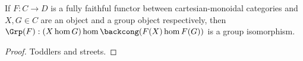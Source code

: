 \begin{lemma}
  \label{0-full-faithful-grp-hom}
  \leanok

  If $F : C \to D$ is a fully faithful functor between cartesian-monoidal categories
  and $X, G \in C$ are an object and a group object respectively,
  then $\Grp(F) : (X \hom G) \hom \backcong (F(X) \hom F(G))$ is a group isomorphism.
\end{lemma}
\begin{proof}
  \uses{}
  \leanok

  Toddlers and streets.
\end{proof}
